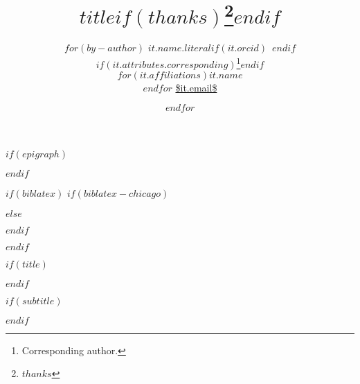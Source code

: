 
$if(epigraph)$
\usepackage{epigraph}
\renewcommand{\epigraphsize}{\sffamily\footnotesize}
\setlength{\epigraphrule}{0em}
\setlength{\beforeepigraphskip}{-2em}
\setlength{\afterepigraphskip}{1em}
$endif$

$if(biblatex)$
$if(biblatex-chicago)$
\usepackage[$if(biblio-style)$$biblio-style$,$endif$$for(biblatexoptions)$$biblatexoptions$$sep$,$endfor$]{biblatex-chicago}
$else$
\usepackage[$if(biblio-style)$style=$biblio-style$,$endif$$for(biblatexoptions)$$biblatexoptions$$sep$,$endfor$]{biblatex}
$endif$

\setlength\bibitemsep{0pt}  %
\renewcommand*{\bibfont}{\footnotesize}  %
\setlength\bibhang{\parindent}  %



$endif$

\usepackage{orcidlink}  %

$if(title)$
\title{$title$$if(thanks)$\thanks{$thanks$}$endif$}
$endif$

$if(subtitle)$
\usepackage{etoolbox}
\makeatletter
\providecommand{\subtitle}[1]{%
  \apptocmd{\@title}{\par {\vskip 0.25em \large #1 \par}}{}{}
}
\makeatother
\subtitle{$subtitle$}
$endif$

\author{
$for(by-author)$
{\large $it.name.literal$$if(it.orcid)$~$endif$}%
$if(it.attributes.corresponding)$\thanks{Corresponding author.}$endif$ \\%
$for(it.affiliations)$$it.name$ \\$endfor$%
{\footnotesize \url{$it.email$}} \and
$endfor$
}

\date{}


%
\usepackage{url}

